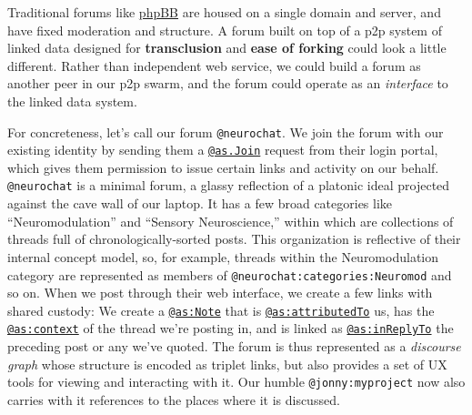 \documentclass[notoc]{tufte-book}
\begin{document}
Traditional forums like \href{https://www.phpbb.com/}{phpBB} are housed
on a single domain and server, and have fixed moderation and structure.
A forum built on top of a p2p system of linked data designed for
\textbf{transclusion} and \textbf{ease of forking} could look a little
different. Rather than independent web service, we could build a forum
as another peer in our p2p swarm, and the forum could operate as an
\emph{interface} to the linked data system.

For concreteness, let's call our forum \texttt{@neurochat}. We join the
forum with our existing identity by sending them a
\href{https://www.w3.org/TR/activitystreams-vocabulary/\#dfn-join}{\texttt{@as.Join}}
request from their login portal, which gives them permission to issue
certain links and activity on our behalf. \texttt{@neurochat} is a
minimal forum, a glassy reflection of a platonic ideal projected against
the cave wall of our laptop. It has a few broad categories like
``Neuromodulation'' and ``Sensory Neuroscience,'' within which are
collections of threads full of chronologically-sorted posts. This
organization is reflective of their internal concept model, so, for
example, threads within the Neuromodulation category are represented as
members of \texttt{@neurochat:categories:Neuromod} and so on. When we
post through their web interface, we create a few links with shared
custody: We create a
\href{https://www.w3.org/TR/activitystreams-vocabulary/\#dfn-note}{\texttt{@as:Note}}
that is
\href{https://www.w3.org/TR/activitystreams-vocabulary/\#dfn-attributedto}{\texttt{@as:attributedTo}}
us, has the
\href{https://www.w3.org/TR/activitystreams-vocabulary/\#dfn-context}{\texttt{@as:context}}
of the thread we're posting in, and is linked as
\href{https://www.w3.org/TR/activitystreams-vocabulary/\#dfn-inreplyto}{\texttt{@as:inReplyTo}}
the preceding post or any we've quoted. The forum is thus represented as
a \emph{discourse graph} whose structure is encoded as triplet links,
but also provides a set of UX tools for viewing and interacting with it.
Our humble \texttt{@jonny:myproject} now also carries with it references
to the places where it is discussed.
\end{document}
